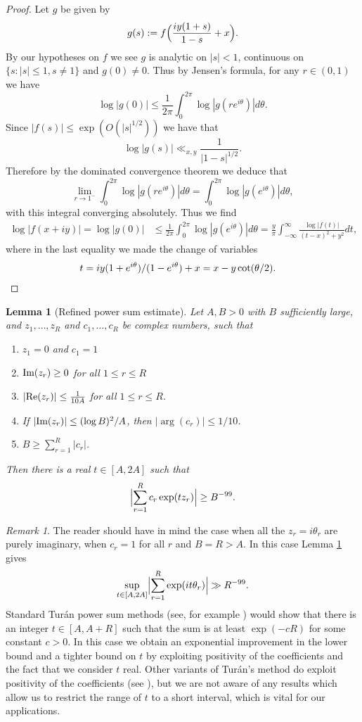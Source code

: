 \documentclass[12pt]{amsart}
\theoremstyle{plain}
\newtheorem{lemma}[theorem]{Lemma}
\theoremstyle{definition}
\theoremstyle{remark}
\newtheorem{remark}[theorem]{Remark}
\begin{document}
\begin{proof}
Let $g$ be given by
\[
g(s):=f\Bigl(\frac{iy(1+s)}{1-s}+x\Bigr).
\]
By our hypotheses on $f$ we see $g$ is analytic on $|s|<1$, continuous on $\{s:|s|\le 1,s\ne 1\}$ and $g(0)\ne 0$. Thus by Jensen's formula, for any $r \in (0,1)$ we have
\[
\log|g(0)|\le \frac{1}{2\pi}\int_0^{2\pi} \log|g(re^{i\theta})|d\theta.
\]
Since $|f(s)|\le \exp (O(|s|^{1/2}))$ we have that 
\[
\log|g(s)|\ll_{x,y} \frac{1}{|1-s|^{1/2}}.
\]
Therefore by the dominated convergence theorem we deduce that
\[
\lim_{r\rightarrow 1^-}\int_0^{2\pi} \log|g(re^{i\theta})|d\theta=\int_0^{2\pi} \log|g(e^{i\theta})|d\theta,
\] 
with this integral converging absolutely. Thus we find
\begin{align*}
\log|f(x+iy)|=\log|g(0)|&\le \frac{1}{2\pi}\int_0^{2\pi}\log|g(e^{i\theta})|d\theta=\frac{y}{\pi}\int_{-\infty}^{\infty} \frac{\log|f(t)|}{(t-x)^2+y^2}dt,
\end{align*}
where in the last equality we made the change of variables 
\begin{align*}
t&=iy(1+e^{i\theta})/(1-e^{i\theta})+x=x-y\cot(\theta/2). \qedhere
\end{align*}
\end{proof}
%
%
%
%
\begin{lemma}[Refined power sum estimate]\label{lmm:Turan}
Let $A,B>0$ with $B$ sufficiently large, and $z_1,\dots,z_R$ and $c_1,\dots,c_R$ be complex numbers, such that
\begin{enumerate}
\item $z_1=0$ and $c_1=1$
\item $\textup{Im}(z_r)\ge 0$ for all $1\le r\le R$
\item $|\textup{Re}(z_r)|\le \frac{1}{10A}$ for all $1\le r\le R$.
\item If $|\textup{Im}(z_r)|\le (\log{B})^2/A$, then $|\arg(c_r)|\le 1/10$.
\item $B\ge\sum_{r=1}^R |c_r|$.
\end{enumerate}
Then there is a real $t\in[A,2A]$ such that
\[
\Bigl|\sum_{r=1}^R c_r \exp(t z_r)\Bigr|\ge B^{-99}.
\]
\end{lemma}
%
%
%
%
\begin{remark}
The reader should have in mind the case when all the $z_r=i\theta_r$ are purely imaginary, when $c_r=1$ for all $r$ and $B=R>A$. In this case Lemma \ref{lmm:Turan} gives
\[
\sup_{t\in [A,2A]}\Bigl|\sum_{r=1}^{R}\exp(i t \theta_r)\Bigr|\gg R^{-99}.
\]
Standard Tur\'an power sum methods (see, for example \cite[Chapter 5, Theorem 1]{Mon1994}) would show that there is an integer $t\in[A,A+R]$ such that the sum is at least $\exp(- c R )$ for some constant $c>0$. In this case we obtain an exponential improvement in the lower bound and a tighter bound on $t$ by exploiting positivity of the coefficients and the fact that we consider $t$ real. Other variants of Tur\'an's method do exploit positivity of the coefficients (see \cite[Chapter 5, \S  6]{Mon1994}), but we are not aware of any results which allow us to restrict the range of $t$ to a short interval, which is vital for our applications.
\end{remark}
\end{document}
